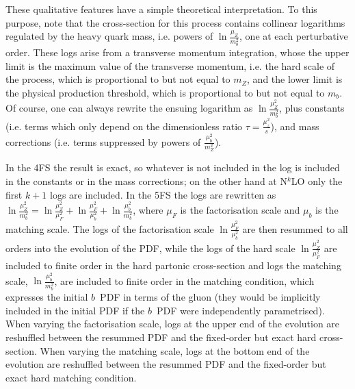 \documentclass[12pt]{article}
\begin{document}
These qualitative features have a simple theoretical
interpretation. To this purpose, note that the cross-section for
this process contains collinear logarithms regulated by the heavy
quark mass, i.e. powers of $\ln\frac{\mu_Z}{m_b^2}$, one at each
perturbative order. These logs  
arise from a transverse
momentum integration, whose the upper limit is the maximum value of the
transverse momentum, i.e. the hard scale of the process, 
which is proportional to but not equal to $m_Z$, and the lower limit
is the physical production threshold, which is proportional to but not
equal to $m_b$. Of course, one can always rewrite the ensuing
logarithm as  $\ln\frac{\mu_Z^2}{m_b^2}$, plus constants (i.e. terms
which only depend on the dimensionless ratio $\tau=\frac{\mu_z^2}{s}$),
and mass corrections (i.e. terms suppressed by powers of
$\frac{\mu^2_b}{m_Z^2}$). 

In the 4FS the result is exact, so whatever is not included in the log is included in
the constants or in the mass corrections; on the other hand at
N$^{k}$LO only the first $k+1$ logs are included. In the 5FS the logs are
rewritten as
$\ln\frac{\mu_Z^2}{m_b^2}=\ln\frac{\mu_Z^2}{\mu_F^2}+\ln\frac{\mu_F^2}{\mu_b^2}+\ln\frac{\mu_b^2}{m_b^2}
$, where $\mu_F$ is the factorisation  scale and 
$\mu_b$ is the matching scale. The logs of the factorisation scale 
$\ln\frac{\mu_F^2}{\mu_b^2}$ are then resummed to all orders into
the evolution of the PDF, while
the logs of the hard scale $\ln\frac{\mu_Z^2}{\mu_F^2}$ are included to
finite order in the hard partonic cross-section and
logs the matching scale, $\ln\frac{\mu_b^2}{m_b^2}$, are 
included to finite order in the matching condition, which
expresses the initial $b$~PDF in terms of the gluon (they would be 
implicitly included in the initial PDF
if the $b$~PDF were independently parametrised).
When varying the factorisation scale, logs at the upper end
of the evolution are reshuffled between the resummed PDF and the
fixed-order but exact hard cross-section. When varying the matching
scale, logs at the bottom end 
of the evolution are reshuffled between the resummed PDF and the
fixed-order but exact hard matching condition.
\end{document}
